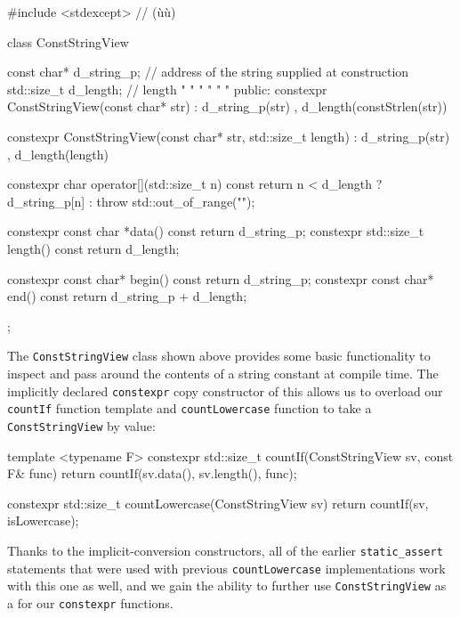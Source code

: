 \begin{emcppslisting}[emcppsbatch=e12]
#include <stdexcept>  // (ù{}ù)

class ConstStringView
{
    const char* d_string_p;  // address of the string supplied at construction
    std::size_t d_length;    // length  "  "     "       "     "       "
public:
    constexpr ConstStringView(const char* str)
    : d_string_p(str)
    , d_length(constStrlen(str)) {}

    constexpr ConstStringView(const char* str, std::size_t length)
    : d_string_p(str)
    , d_length(length) {}

    constexpr char operator[](std::size_t n) const
    {
        return n < d_length ? d_string_p[n] : throw std::out_of_range("");
    }

    constexpr const char *data() const { return d_string_p; }
    constexpr std::size_t length() const { return d_length; }

    constexpr const char* begin() const { return d_string_p; }
    constexpr const char* end()  const { return d_string_p + d_length; }
};
\end{emcppslisting}
    

\noindent The \lstinline!ConstStringView! class shown above provides some basic
functionality to inspect and pass around the contents of a string
constant at compile time. The implicitly declared \lstinline!constexpr!
copy constructor of this  allows us to overload our
\lstinline!countIf! function template and \lstinline!countLowercase! function
to take a \lstinline!ConstStringView! by value:

\begin{emcppslisting}[emcppsbatch=e12]
template <typename F>
constexpr std::size_t countIf(ConstStringView sv, const F& func)
{
    return countIf(sv.data(), sv.length(), func);
}

constexpr std::size_t countLowercase(ConstStringView sv)
{
    return countIf(sv, isLowercase);
}
\end{emcppslisting}
    

\noindent Thanks to the implicit-conversion constructors, all of the earlier
\lstinline!static_assert! statements that were used with previous
\lstinline!countLowercase! implementations work with this one as well, and
we gain the ability to further use \lstinline!ConstStringView! as a
 for our \lstinline!constexpr! functions.

